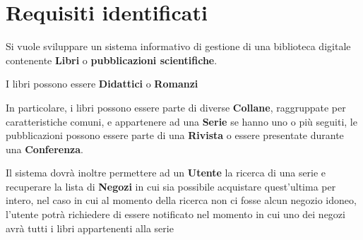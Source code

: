 \chapter{Requisiti identificati}
Si vuole sviluppare un sistema informativo di gestione di una biblioteca digitale contenente \textbf{Libri} o
\textbf{pubblicazioni scientifiche}.

I libri possono essere \textbf{Didattici} o \textbf{Romanzi}

In particolare, i libri possono essere parte di diverse \textbf{Collane}, raggruppate per caratteristiche
comuni, e appartenere ad una \textbf{Serie} se hanno uno o più seguiti, le pubblicazioni possono essere parte di una \textbf{Rivista} o essere 
presentate durante una \textbf{Conferenza}.

Il sistema dovrà inoltre permettere ad un \textbf{Utente} la ricerca di una serie
e recuperare la lista di \textbf{Negozi} in cui sia possibile acquistare quest'ultima per intero,
nel caso in cui al momento della ricerca non ci fosse alcun negozio idoneo, l'utente potrà richiedere
di essere notificato nel momento in cui uno dei negozi avrà tutti i libri appartenenti alla serie